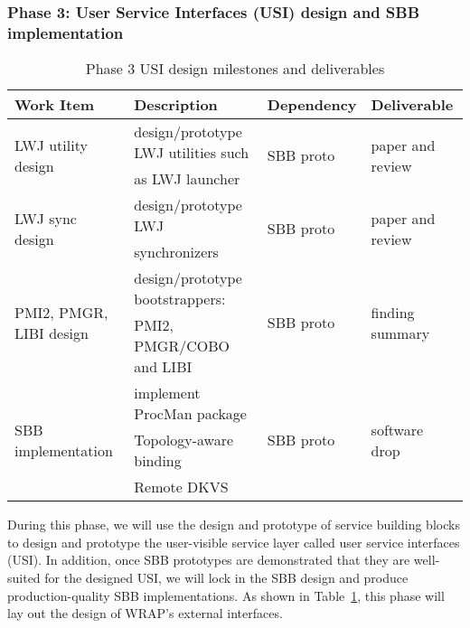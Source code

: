 \subsubsection{Phase 3: User Service Interfaces (USI) design and SBB implementation}
\begin{table}
\centering
\begin{tabular}{|l|l|l|l|}
\hline
Work Item & Description & Dependency & Deliverable \\
\hline
\multirow{2}{*}{LWJ utility design} & design/prototype LWJ utilities such & \multirow{2}{*}{SBB proto} & \multirow{2}{*}{paper and review} \\
& as LWJ launcher & & \\ \hline
\multirow{2}{*}{LWJ sync design} & design/prototype LWJ & \multirow{2}{*}{SBB proto} & \multirow{2}{*}{paper and review} \\
& synchronizers & & \\ \hline
\multirow{2}{*}{PMI2, PMGR, LIBI design} & design/prototype bootstrappers: & \multirow{2}{*}{SBB proto} & \multirow{2}{*}{finding summary} \\
& PMI2, PMGR/COBO and LIBI & & \\ \hline
\multirow{3}{*}{SBB implementation} & implement ProcMan package & \multirow{3}{*}{SBB proto} & \multirow{3}{*}{software drop} \\
& Topology-aware binding & & \\
& Remote DKVS & & \\ \hline
\end{tabular}
\caption{Phase 3 USI design milestones and deliverables}
\label{tab:phase3}
\end{table}

During this phase, we will use the design and prototype of service building blocks
to design and prototype the user-visible service layer called user service interfaces (USI).
In addition, once SBB prototypes are demonstrated that they are well-suited for the designed USI,
we will lock in the SBB design and produce production-quality SBB implementations.
As shown in Table~\ref{tab:phase3},
this phase will lay out the design of WRAP's external interfaces.

